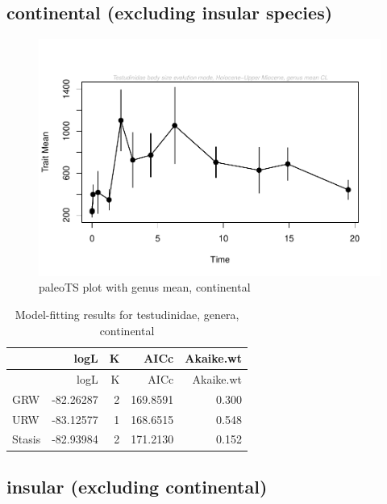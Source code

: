 \FloatBarrier

\subsection{continental (excluding insular
	species)}\label{continental-excluding-insular-species}


\begin{figure}[H]
	\centering
	\includegraphics{MA_JJ_files/figure-latex/paleoTSC-1.pdf}
	\caption{paleoTS plot with genus mean, continental}
	\label{fig:pTSC}
\end{figure}

\begin{longtable}[]{@{}lrrrr@{}}
	\caption{Model-fitting results for testudinidae, genera,
		continental}
	\label{tab:pTSCEM}\tabularnewline
	\toprule
	& logL & K & AICc & Akaike.wt\tabularnewline
	\midrule
	\endfirsthead
	\toprule
	& logL & K & AICc & Akaike.wt\tabularnewline
	\midrule
	\endhead
	GRW & -82.26287 & 2 & 169.8591 & 0.300\tabularnewline
	URW & -83.12577 & 1 & 168.6515 & 0.548\tabularnewline
	Stasis & -82.93984 & 2 & 171.2130 & 0.152\tabularnewline
	\bottomrule
\end{longtable}


\FloatBarrier

\subsection{insular (excluding
	continental)}\label{insular-excluding-continental}




